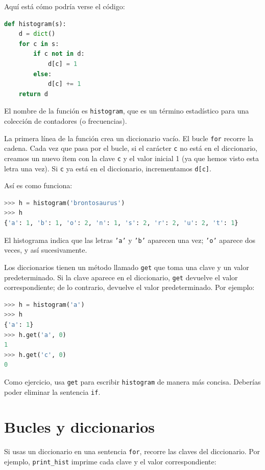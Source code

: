 Aquí está cómo podría verse el código:

\begin{lstlisting}[language=Python]
def histogram(s):
    d = dict()
    for c in s:
        if c not in d:
            d[c] = 1
        else:
            d[c] += 1
    return d
\end{lstlisting}

El nombre de la función es \texttt{histogram}, que es un término estadístico para una colección de contadores (o frecuencias).

La primera línea de la función crea un diccionario vacío. El bucle \texttt{for} recorre la cadena. Cada vez que pasa por el bucle, si el carácter \texttt{c} no está en el diccionario, creamos un nuevo ítem con la clave \texttt{c} y el valor inicial 1 (ya que hemos visto esta letra una vez). Si \texttt{c} ya está en el diccionario, incrementamos \texttt{d[c]}.

Así es como funciona:

\begin{lstlisting}[language=Python]
>>> h = histogram('brontosaurus')
>>> h
{'a': 1, 'b': 1, 'o': 2, 'n': 1, 's': 2, 'r': 2, 'u': 2, 't': 1}
\end{lstlisting}

El histograma indica que las letras \texttt{'a'} y \texttt{'b'} aparecen una vez; \texttt{'o'} aparece dos veces, y así sucesivamente.

Los diccionarios tienen un método llamado \texttt{get} que toma una clave y un valor predeterminado. Si la clave aparece en el diccionario, \texttt{get} devuelve el valor correspondiente; de lo contrario, devuelve el valor predeterminado. Por ejemplo:

\begin{lstlisting}[language=Python]
>>> h = histogram('a')
>>> h
{'a': 1}
>>> h.get('a', 0)
1
>>> h.get('c', 0)
0
\end{lstlisting}

Como ejercicio, usa \texttt{get} para escribir \texttt{histogram} de manera más concisa. Deberías poder eliminar la sentencia \texttt{if}.

\section{Bucles y diccionarios}

Si usas un diccionario en una sentencia \texttt{for}, recorre las claves del diccionario. Por ejemplo, \texttt{print\_hist} imprime cada clave y el valor correspondiente:

